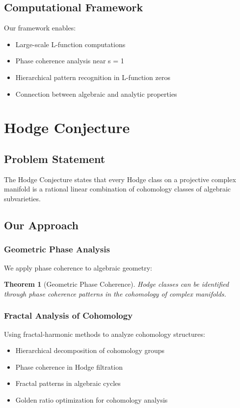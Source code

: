 \documentclass[12pt]{article}
\newtheorem{theorem}{Theorem}
\begin{document}
\subsection{Computational Framework}

Our framework enables:
\begin{itemize}
    \item Large-scale L-function computations
    \item Phase coherence analysis near s = 1
    \item Hierarchical pattern recognition in L-function zeros
    \item Connection between algebraic and analytic properties
\end{itemize}

\section{Hodge Conjecture}

\subsection{Problem Statement}
The Hodge Conjecture states that every Hodge class on a projective complex manifold is a rational linear combination of cohomology classes of algebraic subvarieties.

\subsection{Our Approach}

\subsubsection{Geometric Phase Analysis}

We apply phase coherence to algebraic geometry:

\begin{theorem}[Geometric Phase Coherence]
Hodge classes can be identified through phase coherence patterns in the cohomology of complex manifolds.
\end{theorem}

\subsubsection{Fractal Analysis of Cohomology}

Using fractal-harmonic methods to analyze cohomology structures:
\begin{itemize}
    \item Hierarchical decomposition of cohomology groups
    \item Phase coherence in Hodge filtration
    \item Fractal patterns in algebraic cycles
    \item Golden ratio optimization for cohomology analysis
\end{itemize}
\end{document}
